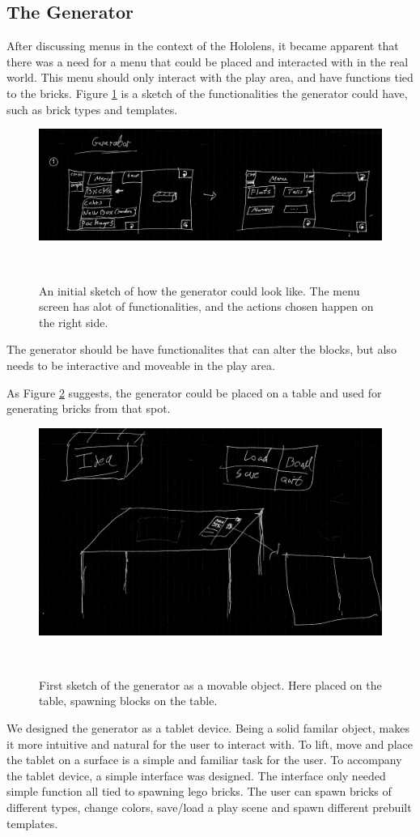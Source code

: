 \subsection{The Generator}
After discussing menus in the context of the Hololens, it became apparent that there was a need for a menu that could be placed and interacted with in the real world. This menu should only interact with the play area, and have functions tied to the bricks. Figure \ref{fig:genboard1} is a sketch of the functionalities the generator could have, such as brick types and templates.
\begin{figure}[t]
	\centering
	\includegraphics[width=0.7\columnwidth]{figures/Generator/gen5.png}
	\caption{An initial sketch of how the generator could look like. The menu screen has alot of functionalities, and the actions chosen happen on the right side.}~\label{fig:genboard1}
\end{figure}
The generator should be have functionalites that can alter the blocks, but also needs to be interactive and moveable in the play area.\par
As Figure \ref{fig:gentablet} suggests, the generator could be placed on a table and used for generating bricks from that spot.
\begin{figure}[t]
	\centering
	\includegraphics[width=0.7\columnwidth]{figures/Generator/gen6.png}
	\caption{First sketch of the generator as a movable object. Here placed on the table, spawning blocks on the table.}~\label{fig:gentablet}
\end{figure}
We designed the generator as a tablet device. Being a solid familar object, makes it more intuitive and natural for the user to interact with. To lift, move and place the tablet on a surface is a simple and familiar task for the user. To accompany the tablet device, a simple interface was designed. The interface only needed simple function all tied to spawning lego bricks. The user can spawn bricks of different types, change colors, save/load a play scene and spawn different prebuilt templates.
